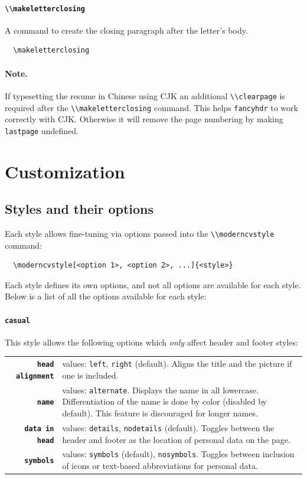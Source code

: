 \documentclass[a4paper, 11pt]{article}
\newcommand{\note}{\paragraph{Note.}}
\newcommand{\code}[1]{\lstinline!#1!}
\begin{document}
\paragraph{\code{\\makeletterclosing}}
A command to create the closing paragraph after the letter's body.
\begin{lstlisting}
  \makeletterclosing
\end{lstlisting}

\note If typesetting the resume in Chinese using CJK an additional \code{\\clearpage} is required after the \code{\\makeletterclosing} command. This helps \code{fancyhdr} to work correctly with CJK. Otherwise it will remove the page numbering by making \code{lastpage} undefined.

\section{Customization}
\label{section:customization}
\subsection{Styles and their options}
\label{section:customization:stylesAndOptions}
Each style allows fine-tuning via options passed into the \code{\\moderncvstyle} command:
\begin{lstlisting}
  \moderncvstyle[<option 1>, <option 2>, ...]{<style>}
\end{lstlisting}
Each style defines its own options, and not all options are available for each style.
Below is a list of all the options available for each style:

\paragraph{\code{casual}}
This style allows the following options which \emph{only} affect header and footer styles:

\begin{tabular}{r@{\hspace{2ex}}p{}}
  \textbf{\code{head alignment}} & values: \code{left}, \code{right} (default).
  Aligns the title and the picture if one is included. \\
  \textbf{\code{name}}           & values: \code{alternate}.
  Displays the name in all lowercase.
  Differentiation of the name is done by color (disabled by default).
  This feature is discouraged for longer names. \\
  \textbf{\code{data in head}}   & values: \code{details}, \code{nodetails} (default).
  Toggles between the header and footer as the location of personal data on the page. \\
  \textbf{\code{symbols}}        & values: \code{symbols} (default), \code{nosymbols}.
  Toggles between inclusion of icons or text-based abbreviations for personal data.
\end{tabular}
\end{document}
